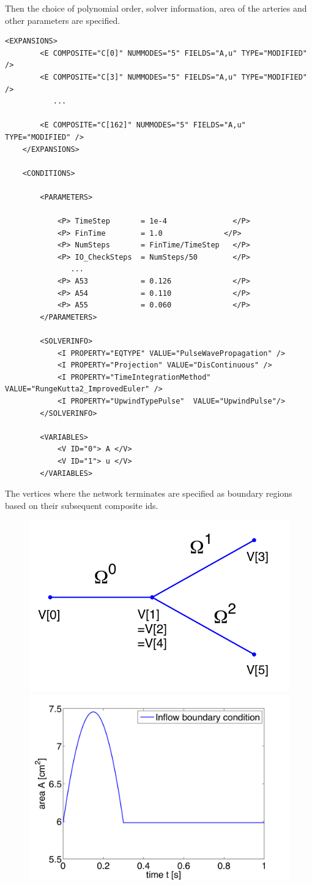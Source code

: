 Then the choice of polynomial order, solver information, area of the arteries
and other parameters are specified.

\begin{lstlisting}[style=XmlStyle]
    <EXPANSIONS>
        <E COMPOSITE="C[0]" NUMMODES="5" FIELDS="A,u" TYPE="MODIFIED" />
        <E COMPOSITE="C[3]" NUMMODES="5" FIELDS="A,u" TYPE="MODIFIED" />
           ...

        <E COMPOSITE="C[162]" NUMMODES="5" FIELDS="A,u" TYPE="MODIFIED" />
    </EXPANSIONS>

    <CONDITIONS>

        <PARAMETERS>

            <P> TimeStep       = 1e-4               </P> 
            <P> FinTime        = 1.0              </P>
            <P> NumSteps       = FinTime/TimeStep   </P>
            <P> IO_CheckSteps  = NumSteps/50        </P>
               ...
            <P> A53            = 0.126              </P>
            <P> A54            = 0.110              </P>
            <P> A55            = 0.060              </P>
        </PARAMETERS>

        <SOLVERINFO>
            <I PROPERTY="EQTYPE" VALUE="PulseWavePropagation" />
            <I PROPERTY="Projection" VALUE="DisContinuous" />
            <I PROPERTY="TimeIntegrationMethod" VALUE="RungeKutta2_ImprovedEuler" />
            <I PROPERTY="UpwindTypePulse"  VALUE="UpwindPulse"/> 
        </SOLVERINFO>

        <VARIABLES>
            <V ID="0"> A </V>
            <V ID="1"> u </V>
        </VARIABLES>

\end{lstlisting}

The vertices where the network terminates are specified as boundary regions
based on their subsequent composite ids.

\begin{figure}
	\includegraphics[width=0.49\linewidth]{Figures/Bifurcation.png}
	\includegraphics[width=0.49\linewidth]{Figures/Network_Inflow.png}
\end{figure}

